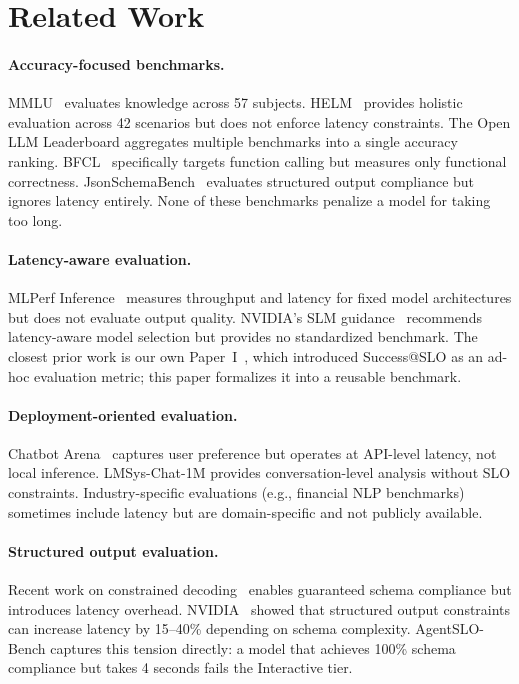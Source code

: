 \documentclass[11pt]{article}
\begin{document}
\section{Related Work}

\paragraph{Accuracy-focused benchmarks.}
MMLU~\cite{hendrycks2021mmlu} evaluates knowledge across 57 subjects.  HELM~\cite{liang2023helm} provides holistic evaluation across 42 scenarios but does not enforce latency constraints.  The Open LLM Leaderboard aggregates multiple benchmarks into a single accuracy ranking.  BFCL~\cite{patil2023gorilla} specifically targets function calling but measures only functional correctness.  JsonSchemaBench~\cite{geng2025jsonschemabench} evaluates structured output compliance but ignores latency entirely.  None of these benchmarks penalize a model for taking too long.

\paragraph{Latency-aware evaluation.}
MLPerf Inference~\cite{reddi2020mlperf} measures throughput and latency for fixed model architectures but does not evaluate output quality.  NVIDIA's SLM guidance~\cite{nvidia2025slm} recommends latency-aware model selection but provides no standardized benchmark.  The closest prior work is our own Paper~I~\cite{maloney2025deploymentgap}, which introduced Success@SLO as an ad-hoc evaluation metric; this paper formalizes it into a reusable benchmark.

\paragraph{Deployment-oriented evaluation.}
Chatbot Arena~\cite{chiang2024chatbot} captures user preference but operates at API-level latency, not local inference.  LMSys-Chat-1M provides conversation-level analysis without SLO constraints.  Industry-specific evaluations (e.g., financial NLP benchmarks) sometimes include latency but are domain-specific and not publicly available.

\paragraph{Structured output evaluation.}
Recent work on constrained decoding~\cite{willard2023outlines, llamaCppGrammar} enables guaranteed schema compliance but introduces latency overhead.  NVIDIA~\cite{nvidia2025slm} showed that structured output constraints can increase latency by 15--40\% depending on schema complexity.  AgentSLO-Bench captures this tension directly: a model that achieves 100\% schema compliance but takes 4 seconds fails the Interactive tier.
\end{document}
